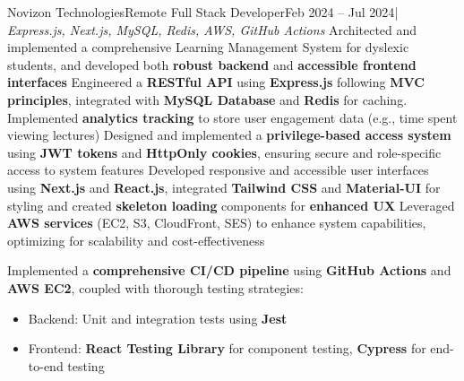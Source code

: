 \resumeSubheading
  {Novizon Technologies}{Remote}
  {Full Stack Developer}{Feb 2024 -- Jul 2024}{| \textit{Express.js, Next.js, MySQL, Redis, AWS, GitHub Actions}}
  \resumeItemListStart
    {Architected and implemented a comprehensive Learning Management System for dyslexic students, and developed both \textbf{robust backend} and \textbf{accessible frontend interfaces}}
    {Engineered a \textbf{RESTful API} using \textbf{Express.js} following \textbf{MVC principles}, integrated with \textbf{MySQL Database} and \textbf{Redis} for caching. Implemented \textbf{analytics tracking} to store user engagement data (e.g., time spent viewing lectures)}
    {Designed and implemented a \textbf{privilege-based access system} using \textbf{JWT tokens} and \textbf{HttpOnly cookies}, ensuring secure and role-specific access to system features}
    {Developed responsive and accessible user interfaces using \textbf{Next.js} and \textbf{React.js}, integrated \textbf{Tailwind CSS} and \textbf{Material-UI} for styling and created \textbf{skeleton loading} components for \textbf{enhanced UX}}
    {Leveraged \textbf{AWS services} (EC2, S3, CloudFront, SES) to enhance system capabilities, optimizing for scalability and cost-effectiveness}
    {Implemented a \textbf{comprehensive CI/CD pipeline} using \textbf{GitHub Actions} and \textbf{AWS EC2}, coupled with thorough testing strategies:
    \begin{itemize}
      \item Backend: Unit and integration tests using \textbf{Jest}
      \item Frontend: \textbf{React Testing Library} for component testing, \textbf{Cypress} for end-to-end testing
    \end{itemize}}
  \resumeItemListEnd 